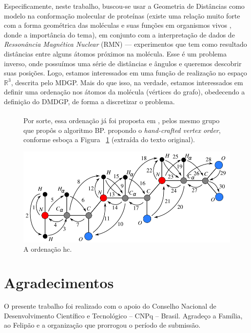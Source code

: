 \documentclass[a4,11pt]{pssbmac}
\begin{document}
	Especificamente, neste trabalho, buscou-se usar a Geometria de Distâncias como modelo na conformação molecular de proteínas (existe uma relação muito forte com a forma geométrica das moléculas e suas funções em organismos vivos \cite{bioquimicaLehninger}, donde a importância do tema), em conjunto com a interpretação de dados de \textit{Ressonância Magnética Nuclear} (RMN) --- experimentos que tem como resultado distâncias entre alguns átomos próximos na molécula. Esse é um problema inverso, onde possuímos uma série de distâncias e ângulos e queremos descobrir suas posições. Logo, estamos interessados em uma função de realização no espaço $\mathbb{R}^3$, descrita pelo MDGP. Mais do que isso, na verdade, estamos interessados em definir uma ordenação nos átomos da molécula (vértices do grafo), obedecendo a definição do DMDGP, de forma a discretizar o problema.
	
	\begin{figure}[h!]
		\centering
		\begin{minipage}{0.46\linewidth}   
			\paragraph{} Por sorte, essa ordenação já foi proposta em \cite{carlile:MinimalOrder}, pelos mesmo grupo que propôs o algoritmo BP. propondo o \textit{hand-crafted vertex order}, conforme esboça a Figura ~\ref{fig:hcVO} (extraída do texto original). 
		\end{minipage}
		\begin{minipage}{0.532\linewidth}
			\includegraphics[scale=0.6]{hcVO.png}
			\caption{A ordenação hc.}
			\label{fig:hcVO}
		\end{minipage}
	\end{figure}
	
	\section*{Agradecimentos}
	O presente trabalho foi realizado com o apoio do Conselho Nacional de Desenvolvimento Científico e Tecnológico – CNPq – Brasil. Agradeço a Família, ao Felipão e a organização que prorrogou o período de submissão.
	
\end{document}
